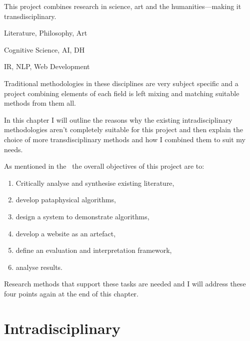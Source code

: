 This project combines research in science, art and the humanities---making it transdisciplinary.

\begin{description}[leftmargin=3cm]
  \item [Pataphysics] Literature, Philosophy, Art
  \item [Creativity] Cognitive Science, \ac{AI}, \ac{DH}
  \item [Technology] \ac{IR}, \ac{NLP}, Web Development
\end{description}

Traditional methodologies in these disciplines are very subject specific and a project combining elements of each field is left mixing and matching suitable methods from them all.

In this chapter I will outline the reasons why the existing intradisciplinary methodologies aren't completely suitable for this project and then explain the choice of more transdisciplinary methods and how I combined them to suit my needs.

As mentioned in the~ the overall objectives of this project are to:

\label{s:objectives}
\begin{enumerate}
  \item Critically analyse and synthesise existing literature,\marginpar{\textspiral~\ref{p:lit}}
  \item develop pataphysical algorithms,\marginpar{\textspiral~\ref{p:practice}}
  \item design a system to demonstrate algorithms,\marginpar{\textspiral~\ref{p:practice}}
  \item develop a website as an artefact,\marginpar{\textspiral~\ref{p:practice}}
  \item define an evaluation and interpretation framework,\marginpar{\textspiral~\ref{p:theory}}
  \item analyse results.\marginpar{\textspiral~\ref{p:analysis}}
\end{enumerate}

Research methods that support these tasks are needed and I will address these four points again at the end of this chapter.


\section{Intradisciplinary}

